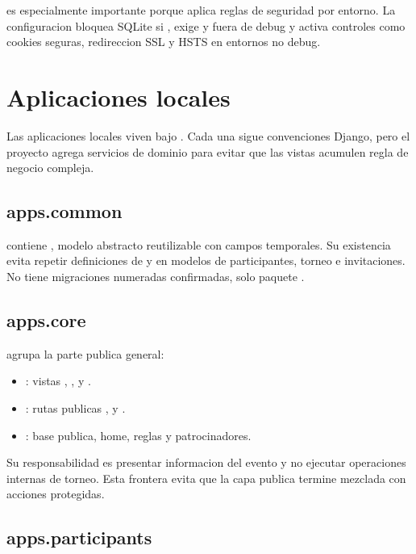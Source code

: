  es especialmente importante porque aplica reglas de seguridad por entorno. La configuracion bloquea SQLite si , exige  y  fuera de debug y activa controles como cookies seguras, redireccion SSL y HSTS en entornos no debug.

\section{Aplicaciones locales}
\label{sec:estructura-apps}

Las aplicaciones locales viven bajo . Cada una sigue convenciones Django, pero el proyecto agrega servicios de dominio para evitar que las vistas acumulen regla de negocio compleja.

\subsection{apps.common}

 contiene , modelo abstracto reutilizable con campos temporales. Su existencia evita repetir definiciones de  y  en modelos de participantes, torneo e invitaciones. No tiene migraciones numeradas confirmadas, solo paquete .

\subsection{apps.core}

 agrupa la parte publica general:

\begin{itemize}
  \item {}: vistas , ,  y .
  \item {}: rutas publicas \ruta{/},  y .
  \item {}: base publica, home, reglas y patrocinadores.
\end{itemize}

Su responsabilidad es presentar informacion del evento y no ejecutar operaciones internas de torneo. Esta frontera evita que la capa publica termine mezclada con acciones protegidas.

\subsection{apps.participants}

